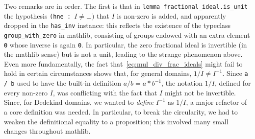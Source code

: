 \documentclass[a4paper,USenglish,cleveref, autoref, thm-restate]{lipics-v2021}
\newcommand{\lean}[1]{\texttt{#1}\xspace} %
\newcommand{\mathlib}{\textsf{mathlib}\xspace}
\begin{document}
Two remarks are in order. The first is that in \lean{lemma fractional\_ideal.is\_unit} the hypothesis \lean{(hne : $I \ne \bot)$} that $I$ is non-zero is added, and apparently dropped in the \lean{has\_inv} instance: this reflects the existence of the typeclass \lean{group\_with\_zero} in \mathlib, consisting of groups endowed with an extra element \lean{0} whose inverse is again \lean{0}. In particular, the zero fractional ideal is invertible (in the \mathlib sense) but is not a unit, leading to the strange phenomenon above. Even more fundamentally, the fact that~\eqref{eq:mul_div_frac_ideals} might fail to hold in certain circumstances shows that, for general domains, $1/I\neq I^{-1}$. Since \lean{a / b} used to have the built-in definition $a / b = a \ast b^{-1}$, the notation $1 / I$, defined for every non-zero $I$, was conflicting with the fact that $I$ might not be invertible. Since, for Dedekind domains, we wanted to \emph{define} $I^{-1}$ as $1 / I$, a major refactor of a core definition was needed. In particular, to break the circularity, we had to weaken the definitional equality to a proposition; this involved many small changes throughout \mathlib.
%
%
%
\end{document}
